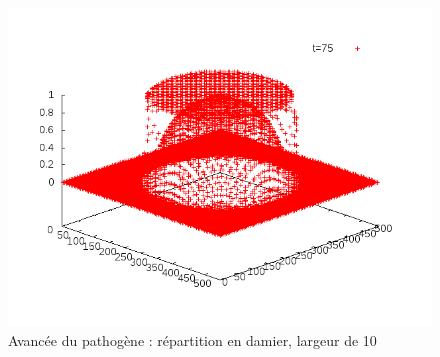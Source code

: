 \documentclass{article}
\begin{document}
\begin{figure}[!h]
	\includegraphics[scale=0.25]{img/anim2-10-150.png}
\caption{Avancée du pathogène : répartition en damier, largeur de 10}
\label{fig3}
\end{figure}
\end{document}
